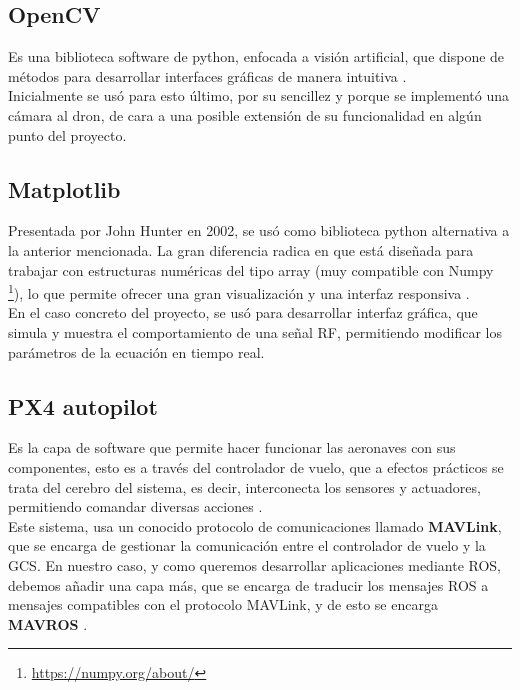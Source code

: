 \subsection{OpenCV}
\label{subsec:opencv}

Es una biblioteca software de python, enfocada a visión artificial, que dispone de métodos para desarrollar interfaces gráficas de manera intuitiva \cite{opencv-def}.\\

Inicialmente se usó para esto último, por su sencillez y porque se implementó una cámara al dron, de cara a una posible extensión de su funcionalidad en algún punto del proyecto.\\

\subsection{Matplotlib}
\label{subsec:matplotlib}

Presentada por John Hunter en 2002, se usó como biblioteca python alternativa a la anterior mencionada. La gran diferencia radica en que está diseñada para trabajar con estructuras numéricas del tipo array (muy compatible con Numpy \footnote{\url{https://numpy.org/about/}}), lo que permite ofrecer una gran visualización y una interfaz responsiva \cite{matplotlib-def}.\\

En el caso concreto del proyecto, se usó para desarrollar interfaz gráfica, que simula y muestra el comportamiento de una señal \ac{RF}, permitiendo modificar los parámetros de la ecuación en tiempo real.\\

\subsection{PX4 autopilot}
\label{subsec:px4}

Es la capa de software que permite hacer funcionar las aeronaves con sus componentes, esto es a través del controlador de vuelo, que a efectos prácticos se trata del cerebro del sistema, es decir, interconecta los sensores y actuadores, permitiendo comandar diversas acciones \cite{flight-controller} \cite{px4-def}.\\

Este sistema, usa un conocido protocolo de comunicaciones llamado \textbf{MAVLink}, que se encarga de gestionar la comunicación entre el controlador de vuelo y la \ac{GCS}. En nuestro caso, y como queremos desarrollar aplicaciones mediante \ac{ROS}, debemos añadir una capa más, que se encarga de traducir los mensajes ROS a mensajes compatibles con el protocolo MAVLink, y de esto se encarga \textbf{MAVROS} \cite{px4-mavlink} \cite{px4-mavros}.\\

